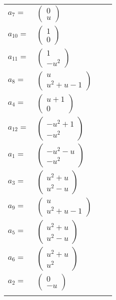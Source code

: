 \documentclass[1p]{elsarticle_modified}
\theoremstyle{definition}
\begin{document}
\begin{tabular}{m{7pt} m{180pt} m{7pt} m{180pt} }
\flushright $a_{7}=$&$\begin{pmatrix}0\\u\end{pmatrix}$ \\
\flushright $a_{10}=$&$\begin{pmatrix}1\\0\end{pmatrix}$ \\
\flushright $a_{11}=$&$\begin{pmatrix}1\\- u^2\end{pmatrix}$ \\
\flushright $a_{8}=$&$\begin{pmatrix}u\\u^2+u-1\end{pmatrix}$ \\
\flushright $a_{4}=$&$\begin{pmatrix}u+1\\0\end{pmatrix}$ \\
\flushright $a_{12}=$&$\begin{pmatrix}- u^2+1\\- u^2\end{pmatrix}$ \\
\flushright $a_{1}=$&$\begin{pmatrix}- u^2- u\\- u^2\end{pmatrix}$ \\
\flushright $a_{3}=$&$\begin{pmatrix}u^2+u\\u^2- u\end{pmatrix}$ \\
\flushright $a_{9}=$&$\begin{pmatrix}u\\u^2+u-1\end{pmatrix}$ \\
\flushright $a_{5}=$&$\begin{pmatrix}u^2+u\\u^2- u\end{pmatrix}$ \\
\flushright $a_{6}=$&$\begin{pmatrix}u^2+u\\u^2\end{pmatrix}$ \\
\flushright $a_{2}=$&$\begin{pmatrix}0\\- u\end{pmatrix}$\\&\end{tabular}
\end{document}

